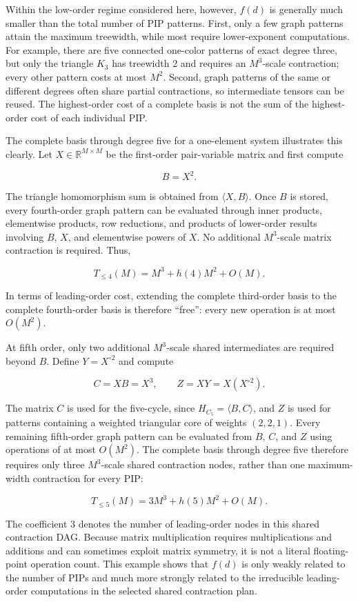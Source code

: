 Within the low-order regime considered here, however, \(f(d)\) is generally much smaller than the total number of PIP patterns. First, only a few graph patterns attain the maximum treewidth, while most require lower-exponent computations. For example, there are five connected one-color patterns of exact degree three, but only the triangle \(K_3\) has treewidth 2 and requires an \(M^3\)-scale contraction; every other pattern costs at most \(M^2\). Second, graph patterns of the same or different degrees often share partial contractions, so intermediate tensors can be reused. The highest-order cost of a complete basis is not the sum of the highest-order cost of each individual PIP.

The complete basis through degree five for a one-element system illustrates this clearly. Let \(X\in\mathbb R^{M\times M}\) be the first-order pair-variable matrix and first compute

\[
B=X^2.
\]

The triangle homomorphism sum is obtained from \(\langle X,B\rangle\). Once \(B\) is stored, every fourth-order graph pattern can be evaluated through inner products, elementwise products, row reductions, and products of lower-order results involving \(B\), \(X\), and elementwise powers of \(X\). No additional \(M^3\)-scale matrix contraction is required. Thus,

\[
T_{\le4}(M)=M^3+h(4)M^2+O(M).
\]

In terms of leading-order cost, extending the complete third-order basis to the complete fourth-order basis is therefore ``free'': every new operation is at most \(O(M^2)\).

At fifth order, only two additional \(M^3\)-scale shared intermediates are required beyond \(B\). Define \(Y=X^{\circ2}\) and compute

\[
C=XB=X^3,
\qquad
Z=XY=X(X^{\circ2}).
\]

The matrix \(C\) is used for the five-cycle, since \(H_{C_5}=\langle B,C\rangle\), and \(Z\) is used for patterns containing a weighted triangular core of weights \((2,2,1)\). Every remaining fifth-order graph pattern can be evaluated from \(B\), \(C\), and \(Z\) using operations of at most \(O(M^2)\). The complete basis through degree five therefore requires only three \(M^3\)-scale shared contraction nodes, rather than one maximum-width contraction for every PIP:

\[
T_{\le5}(M)=3M^3+h(5)M^2+O(M).
\]

The coefficient 3 denotes the number of leading-order nodes in this shared contraction DAG. Because matrix multiplication requires multiplications and additions and can sometimes exploit matrix symmetry, it is not a literal floating-point operation count. This example shows that \(f(d)\) is only weakly related to the number of PIPs and much more strongly related to the irreducible leading-order computations in the selected shared contraction plan.

